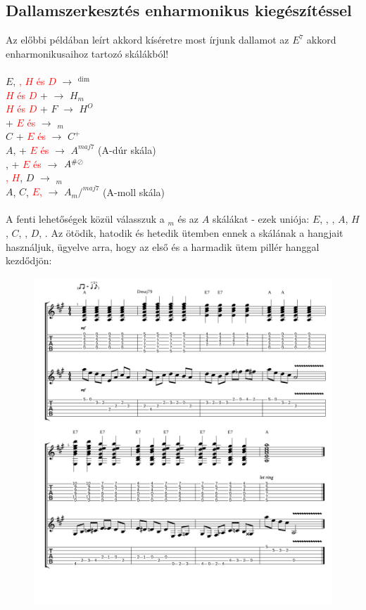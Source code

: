 \subsection{Dallamszerkesztés enharmonikus kiegészítéssel}
\label{sec:exdallamenharm}
Az előbbi példában leírt akkord kíséretre most írjunk dallamot az $E^7$ akkord enharmonikusaihoz tartozó skálákból! \\\\
$E$, \textcolor{red}{\gisz, $H$ és $D$} $\longrightarrow$ \gisz\ignorespaces$^\dim$ \\
\textcolor{red}{$H$ és $D$} + \fisz $\longrightarrow$ $H_m$ \\
\textcolor{red}{$H$ és $D$} + $F$ $\longrightarrow$ $H^O$ \\
\cisz + \textcolor{red}{$E$ és \gisz} $\longrightarrow$ \cisz$_m$ \\
$C$ + \textcolor{red}{$E$ és \gisz} $\longrightarrow$ $C^+$ \\
$A$, \cisz + \textcolor{red}{$E$ és \gisz} $\longrightarrow$ $A^{maj7}$ (A-dúr skála) \\
\aisz, \cisz + \textcolor{red}{$E$ és \gisz} $\longrightarrow$ $A^{\#\oslash}$ \\
\textcolor{red}{\gisz, $H$}, $D$ $\longrightarrow$ \gisz$_m$ \\
$A$, $C$, \textcolor{red}{$E$, \gisz} $\longrightarrow$ $A_m/^{maj7}$ (A-moll skála) \\\\
A fenti lehetőségek közül válasszuk a \cisz$_m$ és az $A$ skálákat - ezek uniója: $E$, \fisz, \gisz, $A$, $H$, $C$, \cisz, $D$, \disz. Az ötödik, hatodik és hetedik ütemben ennek a skálának a hangjait használjuk, ügyelve arra, hogy az első és a harmadik ütem pillér hanggal kezdődjön:
 
\begin{figure}[!htbp]
 \advance\leftskip-6mm
 \includegraphics[page=1,scale=0.85]{notes/dallamszerkesztes_II.pdf}
\end{figure}
